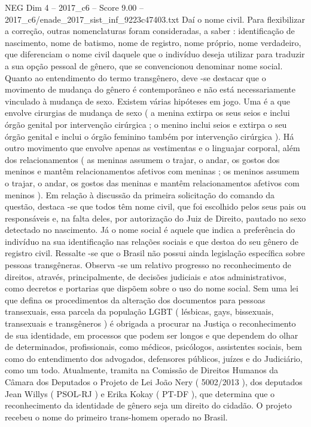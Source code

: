 \begin{textsample}{NEG Dim 4 – 2017\_c6 – Score 9.00 – 2017\_c6/enade\_2017\_sist\_inf\_9223c47403.txt}
Daí o nome civil.
Para flexibilizar a correção, outras nomenclaturas foram consideradas, a saber : identificação de nascimento, nome de batismo, nome de registro, nome próprio, nome verdadeiro, que diferenciam o nome civil daquele que o indivíduo deseja utilizar para traduzir a sua opção pessoal de gênero, que se convencionou denominar nome social.
Quanto ao entendimento do termo transgênero, deve -se destacar que o movimento de mudança do gênero é contemporâneo e não está necessariamente vinculado à mudança de sexo.
Existem várias hipóteses em jogo.
Uma é a que envolve cirurgias de mudança de sexo ( a menina extirpa os seus seios e inclui órgão genital por intervenção cirúrgica ; o menino inclui seios e extirpa o seu órgão genital e inclui o órgão feminino também por intervenção cirúrgica ).
Há outro movimento que envolve apenas as vestimentas e o linguajar corporal, além dos relacionamentos ( as meninas assumem o trajar, o andar, os gostos dos meninos e mantêm relacionamentos afetivos com meninas ; os meninos assumem o trajar, o andar, os gostos das meninas e mantêm relacionamentos afetivos com meninos ).
Em relação à discussão da primeira solicitação do comando da questão, destaca -se que todos têm nome civil, que foi escolhido pelos seus pais ou responsáveis e, na falta deles, por autorização do Juiz de Direito, pautado no sexo detectado no nascimento.
Já o nome social é aquele que indica a preferência do indivíduo na sua identificação nas relações sociais e que destoa do seu gênero de registro civil.
Ressalte -se que o Brasil não possui ainda legislação específica sobre pessoas transgêneras.
Observa -se um relativo progresso no reconhecimento de direitos, através, principalmente, de decisões judiciais e atos administrativos, como decretos e portarias que dispõem sobre o uso do nome social.
Sem uma lei que defina os procedimentos da alteração dos documentos para pessoas transexuais, essa parcela da população LGBT ( lésbicas, gays, bissexuais, transexuais e transgêneros ) é obrigada a procurar na Justiça o reconhecimento de sua identidade, em processos que podem ser longos e que dependem do olhar de determinados, profissionais, como médicos, psicólogos, assistentes sociais, bem como do entendimento dos advogados, defensores públicos, juízes e do Judiciário, como um todo.
Atualmente, tramita na Comissão de Direitos Humanos da Câmara dos Deputados o Projeto de Lei João Nery ( 5002/2013 ), dos deputados Jean Willys ( PSOL-RJ ) e Erika Kokay ( PT-DF ), que determina que o reconhecimento da identidade de gênero seja um direito do cidadão.
O projeto recebeu o nome do primeiro trans-homem operado no Brasil.

\end{textsample}
